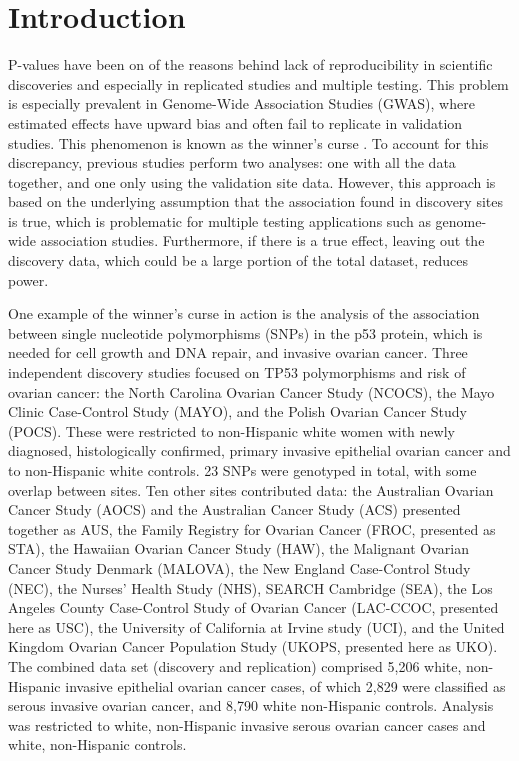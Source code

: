 \documentclass[AMA,STIX1COL]{WileyNJD-v2}\usepackage[]{graphicx}\usepackage[]{color}
\begin{document}
\section{Introduction}\label{sec:intro}

P-values have been on of the reasons behind lack of reproducibility in scientific discoveries and especially in replicated studies and multiple testing\cite{benjamin2017redefine}. This problem is especially prevalent in Genome-Wide Association Studies (GWAS), where estimated effects have upward bias and often fail to replicate in validation studies. This phenomenon is known as the winner's curse  \cite{zollner2007overcoming}. To account for this discrepancy, previous studies perform two analyses: one with all the data together, and one only using the validation site data. However, this approach is based on the underlying assumption that the association found in discovery sites is true, which is problematic for multiple testing applications such as genome-wide association studies. Furthermore, if there is a true effect, leaving out the discovery data, which could be a large portion of the total dataset, reduces power.

One example of the winner's curse in action is the analysis of the association between single nucleotide polymorphisms (SNPs) in the p53 protein, which is needed for cell growth and DNA repair, and invasive ovarian cancer. Three independent discovery studies focused on TP53 polymorphisms and risk of ovarian cancer: the North Carolina Ovarian Cancer Study (NCOCS), the Mayo Clinic Case-Control Study (MAYO), and the Polish Ovarian Cancer Study (POCS). These were restricted to non-Hispanic white women with newly diagnosed, histologically confirmed, primary invasive epithelial ovarian cancer and to non-Hispanic white controls. 23 SNPs were genotyped in total, with some overlap between sites. Ten other sites contributed data: the Australian Ovarian Cancer Study (AOCS) and the Australian Cancer Study (ACS) presented together as AUS, the Family Registry for Ovarian Cancer (FROC, presented as STA), the Hawaiian Ovarian Cancer Study (HAW), the Malignant Ovarian Cancer Study Denmark (MALOVA), the New England Case-Control Study (NEC), the Nurses' Health Study (NHS), SEARCH Cambridge (SEA), the Los Angeles County Case-Control Study of Ovarian Cancer (LAC-CCOC, presented here as USC), the University of California at Irvine study (UCI), and the United Kingdom Ovarian Cancer Population Study (UKOPS, presented here as UKO). The combined data set (discovery and replication) comprised 5,206 white, non-Hispanic invasive epithelial ovarian cancer cases, of which 2,829 were classified as serous invasive ovarian cancer, and 8,790 white non-Hispanic controls. Analysis was restricted to white, non-Hispanic invasive serous ovarian cancer cases and white, non-Hispanic controls.
\end{document}

